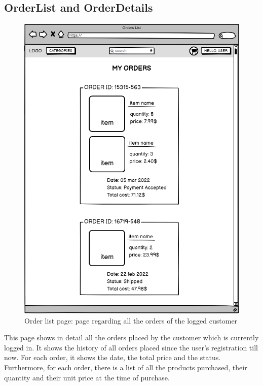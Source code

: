 \subsection{OrderList and OrderDetails}
    \begin{figure}[H]
        \centering
        \includegraphics[width=\textwidth,height=0.7\textheight,keepaspectratio]{mockups/ordersPageMockup.png}
            \caption{Order list page: page regarding all the orders of the logged customer}
            \label{fig:OrderPage}
    \end{figure}

This page shows in detail all the orders placed by the customer which is currently logged in. It shows the history of all orders placed since the user's registration till now. For each order, it shows the date, the total price and the status.
Furthermore, for each order, there is a list of all the products purchased, their quantity and their unit price at the time of purchase.

